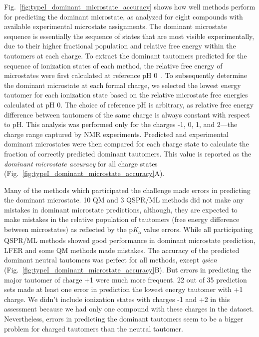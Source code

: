 \documentclass[9pt,lineno,final]{elife}
\newcommand{\pKa}{p\textit{K}\textsubscript{a}}
\begin{document}
Fig.~\ref{fig:typeI_dominant_microstate_accuracy} shows how well methods perform for predicting the dominant microstate, as analyzed for eight compounds with available experimental microstate assignments.
The dominant microstate sequence is essentially the sequence of states that are most visible experimentally, due to their higher fractional population and relative free energy within the tautomers at each charge.
To extract the dominant tautomers predicted for the sequence of ionization states of each method, the relative free energy of microstates were first calculated at reference pH 0~\citep{Gunner:2020:J.Comput.AidedMol.Des.}. 
To subsequently determine the dominant microstate at each formal charge, we selected the lowest energy tautomer for each ionization state based on the relative microstate free energies calculated at pH 0. 
The choice of reference pH is arbitrary, as relative free energy difference between tautomers of the same charge is always constant with respect to pH. 
This analysis was performed only for the charges -1, 0, 1, and 2---the charge range captured by NMR experiments.
Predicted and experimental dominant microstates were then compared for each charge state to calculate the fraction of correctly predicted dominant tautomers. 
This value is reported as the \emph{dominant microstate accuracy} for all charge states (Fig.~\ref{fig:typeI_dominant_microstate_accuracy}A). 

Many of the methods which participated the challenge made errors in predicting the dominant microstate. 
10 QM and 3 QSPR/ML methods did not make any mistakes in dominant microstate predictions, although, they are expected to make mistakes in the relative population of tautomers (free energy difference between microstates) as reflected by the \pKa{} value errors. 
While all participating QSPR/ML methods showed good performance in dominant microstate prediction, LFER and some QM methods made mistakes. 
The accuracy of the predicted dominant neutral tautomers was perfect for all methods, except \textit{qsicn} (Fig.~\ref{fig:typeI_dominant_microstate_accuracy}B). 
But errors in predicting the major tautomer of charge +1 were much more frequent. 
22 out of 35 prediction sets made at least one error in prediction the lowest energy tautomer with +1 charge. 
We didn't include ionization states with charges -1 and +2 in this assessment because we had only one compound with these charges in the dataset. 
Nevertheless, errors in predicting the dominant tautomers seem to be a bigger problem for charged tautomers than the neutral tautomer.    
\end{document}
